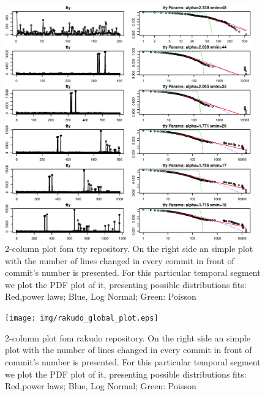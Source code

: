 \documentclass[conference]{IEEEtran}
\begin{document}
\begin{figure}[htbp]
  \centerline{\includegraphics[width=0.95\textwidth]{img/tty_global.eps}}
  \caption{2-column plot fom tty repository. On the right side an
    simple plot with the number of lines changed in every commit in
    front of commit's number is presented. For this particular
    temporal segment we plot the PDF plot of it, presenting possible
    distributions fits: Red,power laws; Blue, Log Normal; Green:
    Poisson}
  \label{fig:tty}
\end{figure}

\begin{figure}[htbp]
  \centerline{\texttt{[image: img/rakudo\_global\_plot.eps]}}
  \caption{2-column plot fom rakudo repository. On the right side an
    simple plot with the number of lines changed in every commit in
    front of commit's number is presented. For this particular
    temporal segment we plot the PDF plot of it, presenting possible
    distributions fits: Red,power laws; Blue, Log Normal; Green:
    Poisson}
  \label{fig:rakudo}
\end{figure}
\end{document}
